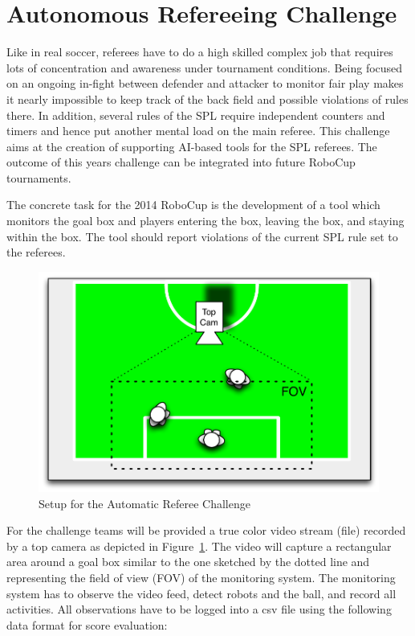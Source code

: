 \documentclass[12pt]{article}
\begin{document}
\newpage






\section{Autonomous Refereeing Challenge}

Like in real soccer, referees have to do a high skilled complex job that requires lots of concentration and awareness under tournament conditions. Being focused on an ongoing in-fight between defender and attacker to monitor fair play makes it nearly impossible to keep track of the back field and possible violations of rules there. In addition, several rules of the SPL require independent counters and timers and hence put another mental load on the main referee. This challenge aims at the creation of supporting AI-based tools for the SPL referees. The outcome of this years challenge can be integrated into future RoboCup tournaments.

The concrete task for the 2014 RoboCup is the development of a tool which monitors the goal box and players entering the box, leaving the box, and staying within the box. The tool should report violations of the current SPL rule set to the referees.

\begin{figure}[th!]
\centerline{\includegraphics[width=0.65\columnwidth]{figures/refmon}}
\caption{Setup for the Automatic Referee Challenge}
\label{fig:referee_challenge}
\end{figure}

For the challenge teams will be provided a true color video stream (file) recorded by a top camera as depicted in Figure~\ref{fig:referee_challenge}. The video will capture a rectangular area around a goal box similar to the one sketched by the dotted line and representing the field of view (FOV) of the monitoring system. The monitoring system has to observe the video feed, detect robots and the ball, and record all activities. All observations have to be logged into a csv file using the following data format for score evaluation:
\end{document}
